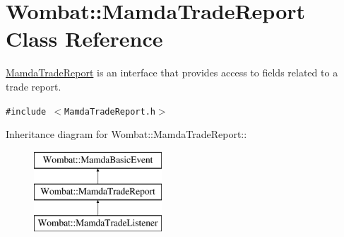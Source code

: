 \hypertarget{classWombat_1_1MamdaTradeReport}{
\section{Wombat::Mamda\-Trade\-Report Class Reference}
\label{classWombat_1_1MamdaTradeReport}
}
\hyperlink{classWombat_1_1MamdaTradeReport}{Mamda\-Trade\-Report} is an interface that provides access to fields related to a trade report.  


{\tt \#include $<$Mamda\-Trade\-Report.h$>$}

Inheritance diagram for Wombat::Mamda\-Trade\-Report::\begin{figure}[H]
\begin{center}
\leavevmode
\includegraphics[height=3cm]{classWombat_1_1MamdaTradeReport}
\end{center}
\end{figure}
